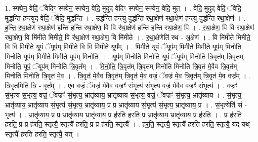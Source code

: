 \documentclass[17pt]{extarticle}
\begin{document}
1. स्फ्येन॒ वेदिं॒ ॅवेदिꣳ॒॒ स्फ्येन॒ स्फ्येन॒ वेदि॒ मुदुद् वेदिꣳ॒॒ स्फ्येन॒ स्फ्येन॒ वेदि॒ मुत् । . वेदि॒ मुदुद् वेदिं॒ ॅवेदि॒ मुद्ध॑न्ति ह॒न्त्युद् वेदिं॒ ॅवेदि॒ मुद्ध॑न्ति । . उद्ध॑न्ति ह॒न्त्यु दुद्ध॑न्ति रथा॒क्षेण॑ रथा॒क्षेण॑ ह॒न्त्यु दुद्ध॑न्ति रथा॒क्षेण॑ । . ह॒न्ति॒ र॒था॒क्षेण॑ रथा॒क्षेण॑ हन्ति हन्ति रथा॒क्षेण॒ वि वि र॑था॒क्षेण॑ हन्ति हन्ति रथा॒क्षेण॒ वि । . र॒था॒क्षेण॒ वि वि र॑था॒क्षेण॑ रथा॒क्षेण॒ वि मि॑मीते मिमीते॒ वि र॑था॒क्षेण॑ रथा॒क्षेण॒ वि मि॑मीते । . र॒था॒क्षेणेति॑ रथ - अ॒क्षेण॑ । . वि मि॑मीते मिमीते॒ वि वि मि॑मीते॒ यूपं॒ ॅयूप॑म् मिमीते॒ वि वि मि॑मीते॒ यूप᳚म् । . मि॒मी॒ते॒ यूपं॒ ॅयूप॑म् मिमीते मिमीते॒ यूप॑म् मिनोति मिनोति॒ यूप॑म् मिमीते मिमीते॒ यूप॑म् मिनोति । . यूप॑म् मिनोति मिनोति॒ यूपं॒ ॅयूप॑म् मिनोति त्रि॒वृत॑म् त्रि॒वृत॑म् मिनोति॒ यूपं॒ ॅयूप॑म् मिनोति त्रि॒वृत᳚म् । . मि॒नो॒ति॒ त्रि॒वृत॑म् त्रि॒वृत॑म् मिनोति मिनोति त्रि॒वृत॑ मे॒वैव त्रि॒वृत॑म् मिनोति मिनोति त्रि॒वृत॑ मे॒व । . त्रि॒वृत॑ मे॒वैव त्रि॒वृत॑म् त्रि॒वृत॑ मे॒व वज्रं॒ ॅवज्र॑ मे॒व त्रि॒वृत॑म् त्रि॒वृत॑ मे॒व वज्र᳚म् । . त्रि॒वृत॒मिति॑ त्रि - वृत᳚म् । . ए॒व वज्रं॒ ॅवज्र॑ मे॒वैव वज्रꣳ॑ सं॒भृत्य॑ सं॒भृत्य॒ वज्र॑ मे॒वैव वज्रꣳ॑ सं॒भृत्य॑ । . वज्रꣳ॑ सं॒भृत्य॑ सं॒भृत्य॒ वज्रं॒ ॅवज्रꣳ॑ सं॒भृत्य॒ भ्रातृ॑व्याय॒ भ्रातृ॑व्याय सं॒भृत्य॒ वज्रं॒ ॅवज्रꣳ॑ सं॒भृत्य॒ भ्रातृ॑व्याय । . सं॒भृत्य॒ भ्रातृ॑व्याय॒ भ्रातृ॑व्याय सं॒भृत्य॑ सं॒भृत्य॒ भ्रातृ॑व्याय॒ प्र प्र भ्रातृ॑व्याय सं॒भृत्य॑ सं॒भृत्य॒ भ्रातृ॑व्याय॒ प्र । . सं॒भृत्येति॑ सं - भृत्य॑ । . भ्रातृ॑व्याय॒ प्र प्र भ्रातृ॑व्याय॒ भ्रातृ॑व्याय॒ प्र ह॑रति हरति॒ प्र भ्रातृ॑व्याय॒ भ्रातृ॑व्याय॒ प्र ह॑रति । . प्र ह॑रति हरति॒ प्र प्र ह॑रति॒ स्तृत्यै॒ स्तृत्यै॑ हरति॒ प्र प्र ह॑रति॒ स्तृत्यै᳚ । . ह॒र॒ति॒ स्तृत्यै॒ स्तृत्यै॑ हरति हरति॒ स्तृत्यै॒ यद् यथ् स्तृत्यै॑ हरति हरति॒ स्तृत्यै॒ यत् । \newline
\end{document}

